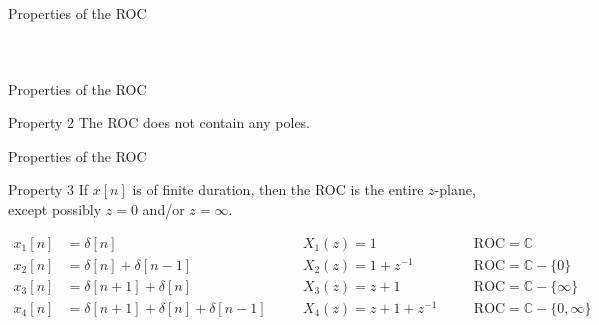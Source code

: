\documentclass[aspectratio=169]{beamer}
\newcommand{\Cross}{$\mathbin{\tikz [x=1.4ex,y=1.4ex,line width=.2ex] \draw (0,0) -- (1,1) (0,1) -- (1,0);}$}%
\begin{document}
\begin{frame}{Properties of the ROC}
\begin{columns}
\begin{figure}[h!]
	\centering
\end{figure}
		
	\end{columns}
\end{frame}

\begin{frame}{Properties of the ROC}
	\begin{block}{Property 2}
		The ROC does not contain any poles.
	\end{block}
\end{frame}

\begin{frame}{Properties of the ROC}
	\begin{block}{Property 3}
		If $ x[n] $ is of finite duration, then the ROC is the entire $ z $-plane, except possibly $ z=0 $ and/or $ z = \infty $.
	\end{block}
\[\begin{aligned}
	x_1[n] &= \delta[n] &\quad& X_1(z) = 1 &\quad&\mathrm{ROC}=\mathbb{C}\\
	x_2[n] &= \delta[n]+\delta[n-1] &\quad& X_2(z) = 1+z^{-1}&\quad&\mathrm{ROC}=\mathbb{C}-\{0\}\\
	x_3[n] &= \delta[n+1]+\delta[n] &\quad& X_3(z) = z+1&\quad&\mathrm{ROC}=\mathbb{C}-\{\infty\}\\
	x_4[n] &= \delta[n+1]+\delta[n]+\delta[n-1] &\quad& X_4(z) = z+1+z^{-1}&\quad&\mathrm{ROC}=\mathbb{C}-\{0,\infty\}
\end{aligned}\]
\end{frame}
\end{document}

